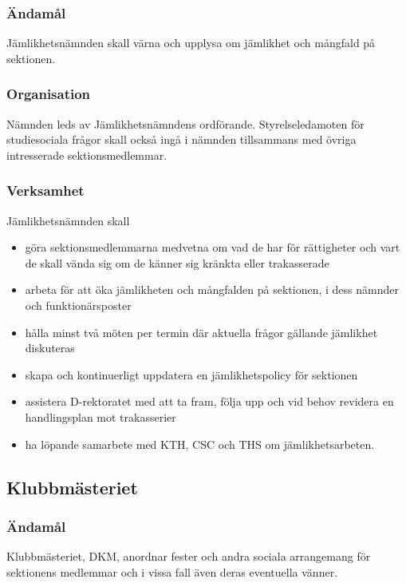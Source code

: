 \documentclass{dgovdoc}
\begin{document}
\subsubsection{Ändamål}

Jämlikhetsnämnden skall värna och upplysa om jämlikhet och mångfald på
sektionen.

\subsubsection{Organisation}

Nämnden leds av Jämlikhetsnämndens ordförande. Styrelseledamoten för
studiesociala frågor skall också ingå i nämnden tillsammans med övriga
intresserade sektionsmedlemmar.

\subsubsection{Verksamhet}

Jämlikhetsnämnden skall

\begin{itemize}
  \item göra sektionsmedlemmarna medvetna om vad de har för rättigheter och
    vart de skall vända sig om de känner sig kränkta eller trakasserade
  \item arbeta för att öka jämlikheten och mångfalden på sektionen, i dess
    nämnder och funktionärsposter
  \item hålla minst två möten per termin där aktuella frågor gällande jämlikhet
    diskuteras
  \item skapa och kontinuerligt uppdatera en jämlikhetspolicy för sektionen
  \item assistera D-rektoratet med att ta fram, följa upp och vid behov
    revidera en handlingsplan mot trakasserier
  \item ha löpande samarbete med KTH, CSC och THS om jämlikhetsarbeten.
\end{itemize}

\subsection{Klubbmästeriet}

\subsubsection{Ändamål}

Klubbmästeriet, DKM, anordnar fester och andra sociala arrangemang för
sektionens medlemmar och i vissa fall även deras eventuella vänner.
\end{document}

